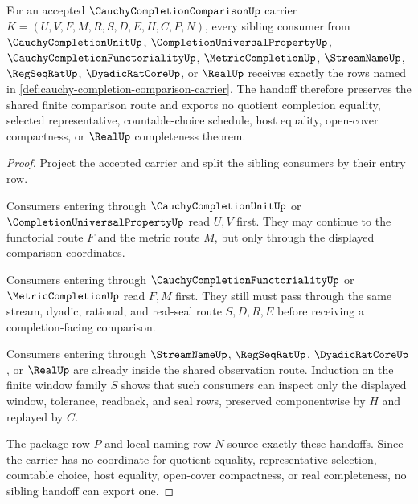 \begin{theorem}
\label{thm:cauchy-completion-comparison-sibling-handoff}
For an accepted $\CauchyCompletionComparisonUp$ carrier $K=(U,V,F,M,R,S,D,E,H,C,P,N)$, every sibling consumer from $\CauchyCompletionUnitUp$, $\CompletionUniversalPropertyUp$, $\CauchyCompletionFunctorialityUp$, $\MetricCompletionUp$, $\StreamNameUp$, $\RegSeqRatUp$, $\DyadicRatCoreUp$, or $\RealUp$ receives exactly the rows named in \autoref{def:cauchy-completion-comparison-carrier}. The handoff therefore preserves the shared finite comparison route and exports no quotient completion equality, selected representative, countable-choice schedule, host equality, open-cover compactness, or $\RealUp$ completeness theorem.
\end{theorem}
\begin{proof}
Project the accepted carrier and split the sibling consumers by their entry row.

Consumers entering through $\CauchyCompletionUnitUp$ or $\CompletionUniversalPropertyUp$ read $U,V$ first. They may continue to the functorial route $F$ and the metric route $M$, but only through the displayed comparison coordinates.

Consumers entering through $\CauchyCompletionFunctorialityUp$ or $\MetricCompletionUp$ read $F,M$ first. They still must pass through the same stream, dyadic, rational, and real-seal route $S,D,R,E$ before receiving a completion-facing comparison.

Consumers entering through $\StreamNameUp$, $\RegSeqRatUp$, $\DyadicRatCoreUp$, or $\RealUp$ are already inside the shared observation route. Induction on the finite window family $S$ shows that such consumers can inspect only the displayed window, tolerance, readback, and seal rows, preserved componentwise by $H$ and replayed by $C$.

The package row $P$ and local naming row $N$ source exactly these handoffs. Since the carrier has no coordinate for quotient equality, representative selection, countable choice, host equality, open-cover compactness, or real completeness, no sibling handoff can export one.
\end{proof}

